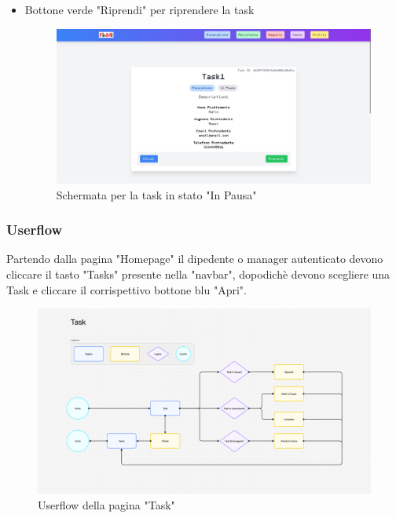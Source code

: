 \documentclass{report}
\begin{document}
\begin{itemize}
	\item Bottone verde "Riprendi" per riprendere la task
	\begin{figure}[H]
		\centering\includegraphics[width=1\textwidth]{images/microservizio-task/frontend/InPausa.jpg}
		\caption{Schermata per la task in stato "In Pausa"}
	\end{figure}
\end{itemize}


\subsubsection*{Userflow}
Partendo dalla pagina "Homepage" il dipedente o manager autenticato devono cliccare il tasto "Tasks" presente nella "navbar", dopodichè devono scegliere una Task e cliccare il corrispettivo bottone blu "Apri".
\begin{figure}[H]
	\centering\includegraphics[width=1\textwidth]{images/microservizio-task/frontend/task-userflow.png}
	Userflow della pagina "Task"
\end{figure}
\end{document}
